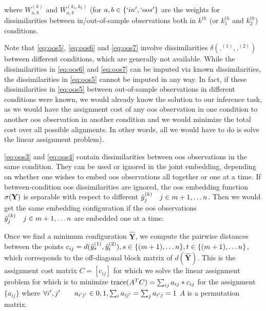 \documentclass[12pt,oneside,final]{thesis}\usepackage[]{graphicx}\usepackage[]{color}
\begin{document}
where $W_{a,b}^{(k)}$ and $W_{a,b}^{(k_1,k_2)}$ (for $a,b \in \{`in', `oos'\}$ are the weights for dissimilarities between in/out-of-sample observations both in $k^{th}$ (or $k_1^{th}$ and $k_2^{th}$) conditions.

Note that \ref{eq:oos5}, \ref{eq:oos6} and \ref{eq:oos7} involve dissimilarities $\delta(.^{(1)},.^{(2)})$ between different conditions, which are generally not available. While  the dissimilarities in \ref{eq:oos6} and \ref{eq:oos7} can be imputed via known dissimilarities, the dissimilarities in \ref{eq:oos5}  cannot be imputed in any way. In fact, if these dissimilarities in  \ref{eq:oos5}   between out-of-sample observations in different conditions were known, we would already know the solution to our inference task, as we would have the  assignment cost  of any oos observation in one condition to another oos observation in another condition and we would minimize the total cost over all possible alignments. In other words, all we would have to do is solve the linear assignment problem).

\ref{eq:oos3} and \ref{eq:oos4} contain dissimilarities between oos observations in the same condition. They can be  used or ignored in the joint embedding, depending on whether one wishes to embed oos observations all together or one at a time. If between-condition oos dissimilarities are ignored, the oos embedding function $\sigma({\bf Y})$ is separable with respect to different  $\hat{y}^{(k)}_{j} \quad j \in m+1,\ldots n$. Then we would get the same embedding configuration if the oos observations $\hat{y}^{(k)}_{j}\quad j \in m+1,\ldots n$ are embedded one at a time.

Once we find a minimum configuration ${ \hat{\mathbf{Y}}}$, we compute the pairwise distances between the points $c_{ij}=d(\yhat^{(1)}_s,\yhat^{(2)}_t),\onespace s \in \{(m+1),\ldots n\}, t \in  \{(m+1),\ldots n\}$, which corresponds to the off-diagonal block matrix of $d({ \hat{\mathbf{Y}}})$. This is the assignment cost matrix $C=\left[c_{ij} \right]$ for which we solve the linear assignment problem for which is to minimize $\textup{trace}(A^{T}C)=\sum_{ij} a_{ij}*c_{ij}$  for the assignment $\{a_{ij}\}$ where
$\forall i',j' \qquad a_{i'j'} \in {0,1},\onespace \sum_{i}{a_{ij'}} =\sum_{j} a_{i'j} =1 $ \ie $A$ is a permutation matrix. 
\end{document}

